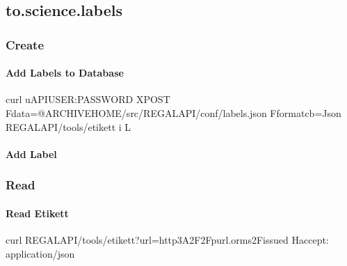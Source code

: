 \documentclass[letterpaper,10pt,english]{sphinxmanual}
\begin{document}
\subsection{to.science.labels}
\label{\detokenize{api-labels:to-science-labels}}\label{\detokenize{api-labels:etikett}}\label{\detokenize{api-labels::doc}}
\sphinxAtStartPar
{}


\subsubsection{Create}
\label{\detokenize{api-labels:create}}\label{\detokenize{api-labels:create-2}}

\paragraph{Add Labels to Database}
\label{\detokenize{api-labels:add-labels-to-database}}\label{\detokenize{api-labels:id1}}
\begin{sphinxVerbatim}[commandchars=\\\{\}]
curl \PYGZhy{}u\PYGZdl{}API\PYGZus{}USER:\PYGZdl{}PASSWORD \PYGZhy{}XPOST \PYGZhy{}F\PYGZdq{}data=@\PYGZdl{}ARCHIVE\PYGZus{}HOME/src/REGAL\PYGZus{}API/conf/labels.json\PYGZdq{} \PYGZhy{}F\PYGZdq{}format\PYGZhy{}cb=Json\PYGZdq{} \PYGZdl{}REGAL\PYGZus{}API/tools/etikett \PYGZhy{}i \PYGZhy{}L
\end{sphinxVerbatim}


\paragraph{Add Label}
\label{\detokenize{api-labels:add-label}}\label{\detokenize{api-labels:id2}}

\subsubsection{Read}
\label{\detokenize{api-labels:read}}\label{\detokenize{api-labels:read-2}}
\begin{sphinxVerbatim}[commandchars=\\\{\}]
  
\end{sphinxVerbatim}


\paragraph{Read Etikett}
\label{\detokenize{api-labels:read-etikett}}\label{\detokenize{api-labels:id3}}
\begin{sphinxVerbatim}[commandchars=\\\{\}]
curl \PYGZdl{}REGAL\PYGZus{}API/tools/etikett?url=http\PYGZpc{}3A\PYGZpc{}2F\PYGZpc{}2Fpurl.orms\PYGZpc{}2Fissued \PYGZhy{}H\PYGZdq{}accept: application/json\PYGZdq{}
\end{sphinxVerbatim}
\end{document}
